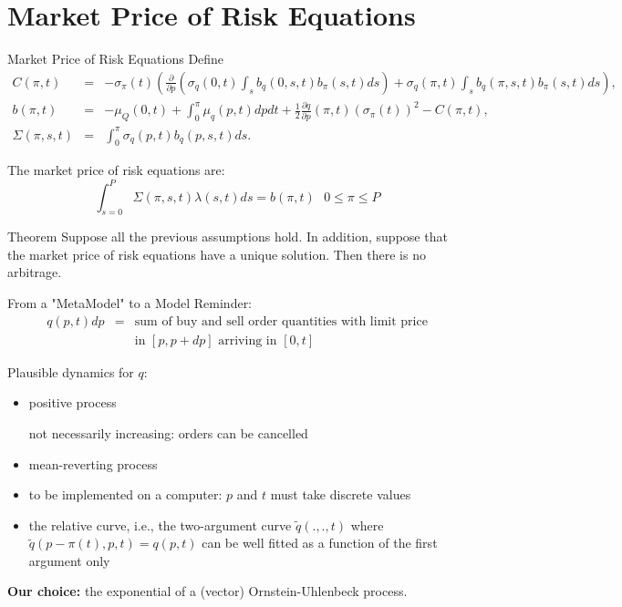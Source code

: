 \documentclass{beamer}
\begin{document}
\section{Market Price of Risk Equations}
\begin{frame}[shrink=30]{{\color{cyan}Market Price of Risk Equations}}
\bigskip
Define
\begin{eqnarray*}
C(\pi ,t) &=&-\sigma _{\pi }(t)\left( \frac{\partial }{\partial p}\left(\sigma _{q}(0,t)\int_{s}b_{q}(0,s,t)b_{\pi }(s,t)ds\right) +\sigma _{q}(\pi,t)\int_{s}b_{q}(\pi ,s,t)b_{\pi }(s,t)ds\right),  \\
b(\pi ,t) &=&-\mu _{Q}(0,t)+\int_{0}^{\pi }\mu _{q}(p,t)dpdt+\frac{1}{2}\frac{\partial q}{\partial p}(\pi ,t)(\sigma _{\pi }(t))^{2}-C(\pi ,t), \\
\Sigma (\pi ,s,t) &=&\int_{0}^{\pi }\sigma _{q}(p,t)b_{q}(p,s,t)ds.
\end{eqnarray*}

\bigskip
The market price of risk equations are:
\begin{equation*}
\int_{s=0}^{P}\Sigma (\pi ,s,t)\lambda (s,t)ds=b(\pi ,t)\text{ \ \ \ \ \ } 0\leq \pi \leq P
\end{equation*}

\begin{block}{Theorem}
Suppose all the previous assumptions hold. In addition, suppose that the market price of risk equations have a unique solution. Then there is no arbitrage.
\end{block}

\end{frame}

\begin{frame}[shrink=30]{{\color{cyan}From a "MetaModel" to a Model}}
\bigskip
Reminder:
\begin{eqnarray*}
q(p,t)dp &=&\text{sum of buy and sell order quantities with limit price} \\
&&\text{in }[p,p+dp]\text{ arriving in }[0,t]\text{ }
\end{eqnarray*}

Plausible dynamics for $q$:

\begin{itemize}
\item positive process

\qquad \qquad not necessarily increasing: orders can be cancelled

\item mean-reverting process

\item to be implemented on a computer: $p$ and $t$ must take discrete values

\item the relative curve, i.e., the two-argument curve $\tilde{q}(.,.,t)$
where $\tilde{q}(p-\pi (t),p,t)=q(p,t)$ can be well fitted as a function of
the first argument only
\end{itemize}

{\color{magenta}\textbf{Our choice:}} the exponential of a (vector) Ornstein-Uhlenbeck process.

\end{frame}
\end{document}
